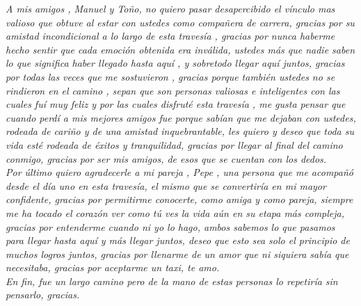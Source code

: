 \documentclass[12pt,letterpaper,spanish, xcolor=table]{report}
\numberwithin{figure}{subsection}
\newenvironment{dedication}{\newpage\large\null\em\vskip1in}%
{\vfill}
\begin{document}
\begin{dedication}
			A mis amigos , Manuel y Toño, no quiero pasar desapercibido el vínculo mas valioso que obtuve al estar con ustedes como compañera de carrera, gracias por su amistad incondicional a lo largo de esta travesía , gracias por nunca haberme hecho sentir que cada emoción obtenida era inválida, ustedes más que nadie saben lo que significa haber llegado hasta aquí , y sobretodo llegar aquí juntos, gracias por todas las veces que me sostuvieron , gracias porque también ustedes no se rindieron en el camino , sepan que son personas valiosas e inteligentes con las cuales fuí muy feliz y por las cuales disfruté esta travesía , me gusta pensar que cuando perdí a mis mejores amigos fue porque sabían que me dejaban con ustedes, rodeada de cariño y de una amistad inquebrantable, les quiero y deseo que toda su vida esté rodeada de éxitos y tranquilidad, gracias por llegar al final del camino conmigo, gracias por ser mis amigos, de esos que se cuentan con los dedos.\\
			
			Por último quiero agradecerle a mi pareja , Pepe , una persona que me acompañó desde el día uno en esta travesía, el mismo que se convertiría en mi mayor confidente, gracias por permitirme conocerte, como amiga y como pareja, siempre me ha tocado el corazón ver como tú ves la vida aún en su etapa más compleja, gracias por entenderme cuando ni yo lo hago, ambos sabemos lo que pasamos para llegar hasta aquí y más llegar juntos, deseo que esto sea solo el principio de muchos logros juntos, gracias por llenarme de un amor que ni siquiera sabía que necesitaba, gracias por aceptarme un taxi, te amo.\\
			
			En fin, fue un largo camino pero de la mano de estas personas lo repetiría sin pensarlo, gracias.
		\end{dedication}
\end{document}
